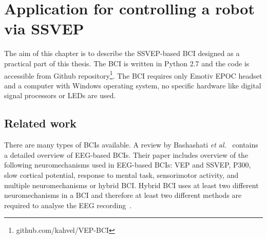 
\chapter{Application for controlling a robot via SSVEP}
\label{sec:SSVEP_BCI}

The aim of this chapter is to describe the \gls{SSVEP}-based \gls{BCI} designed as a practical part of this thesis. The \gls{BCI} is written in Python 2.7 and the code is accessible from Github repository\footnote{github.com/kahvel/VEP-BCI}. The \gls{BCI} requires only Emotiv EPOC headset and a computer with Windows operating system, no specific hardware like digital signal processors or \glspl{LED} are used.

\section{Related work}

There are many types of \glspl{BCI} available. A review by Bashashati \textit{et al.}~\cite{bci_comparison} contains a detailed overview of \gls{EEG}-based \glspl{BCI}. Their paper includes overview of the following neuromechanisms used in \gls{EEG}-based \glspl{BCI}: \gls{VEP} and \gls{SSVEP}, P300, slow cortical potential, response to mental task, sensorimotor activity, and multiple neuromechanisms or hybrid \gls{BCI}. Hybrid \gls{BCI} uses at least two different neuromechanisms in a \gls{BCI} and therefore at least two different methods are required to analyse the \gls{EEG} recording~\cite{hybrid_bci, hybrid_bci2}.

